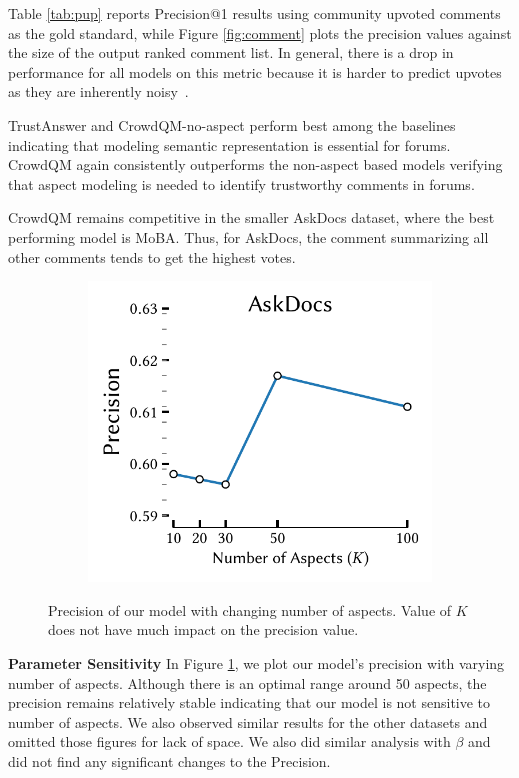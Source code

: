Table \ref{tab:pup} reports Precision@1 results using community upvoted comments as the gold standard, while Figure \ref{fig:comment} plots the precision values against the size of the output ranked comment list. In general, there is a drop in performance for all models on this metric because it is harder to predict upvotes as they are inherently noisy~\cite{gilbert2013widespread}.

TrustAnswer and CrowdQM-no-aspect perform best among the baselines indicating that modeling semantic representation is essential for forums. CrowdQM again consistently outperforms the non-aspect based models verifying that aspect modeling is needed to identify trustworthy comments in forums.

CrowdQM remains competitive in the smaller AskDocs dataset, where the best performing model is MoBA. Thus, for AskDocs, the comment summarizing all other comments tends to get the highest votes.

\begin{figure}[tbh]
\begin{subfigure}{\linewidth}
\centering
\includegraphics[scale=0.67]{images/Precision_aspect.pdf}
\end{subfigure}
\caption{\label{fig:aspect} Precision of our model with changing number of aspects. Value of $K$ does not have much impact on the precision value.}
\end{figure}

\textbf{Parameter Sensitivity} In Figure \ref{fig:aspect}, we plot our model's precision with varying number of aspects. Although there is an optimal range around 50 aspects, the precision remains relatively stable
indicating that our model is not sensitive to number of aspects. We also observed similar results for the other datasets and omitted those figures for lack of space. We also did similar analysis with $\beta$ and did not find any significant changes to the Precision.


